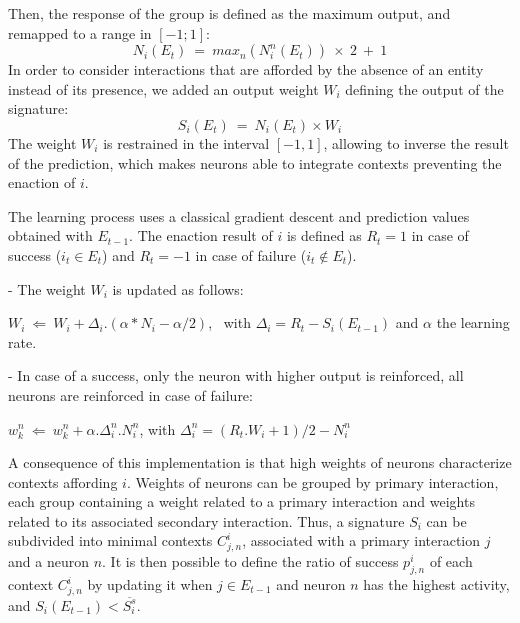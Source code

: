 \documentclass[conference]{IEEEtran}
\begin{document}
Then, the response of the group is defined as the maximum output, and remapped to a range in $[-1;1]$:
\begin{equation}
N_i(E_t)~=~max_n (N_i^n(E_t) ) \: \times \: 2 ~+~ 1
\end{equation}
In order to consider interactions that are afforded by the absence of an entity instead of its presence, we added an output weight $W_i$ defining the output of the signature:
\begin{equation}
S_i(E_t)~=~N_i(E_t) \times W_i
\end{equation}
The weight $W_i$ is restrained in the interval $[-1,1]$, allowing to inverse the result of the prediction, which makes neurons able to integrate contexts preventing the enaction of $i$.

The learning process uses a classical gradient descent and prediction values obtained with $E_{t-1}$.
The enaction result of $i$ is defined as $R_t=1$ in case of success ($i_t \in E_t$) and $R_t=-1$ in case of failure ($i_t \not\in E_t$).

- The weight $W_i$ is updated as follows:

$W_i ~\Leftarrow~ W_i+ \Delta_i . (\alpha * N_i - \alpha /2)$, ~with $\Delta_i=R_t-S_i(E_{t-1})$
and $\alpha$ the learning rate.

- In case of a success, only the neuron with higher output is reinforced, all neurons are reinforced in case of failure:

$w_k^n ~\Leftarrow~ w_k^n+ \alpha . \Delta_i^n . N_i^n$,
with $\Delta_i^n=(R_t.W_i + 1)/2 - N_i^n$


A consequence of this implementation is that high weights of neurons characterize contexts affording $i$.
Weights of neurons can be grouped by primary interaction, each group containing a weight related to a primary interaction and weights related to its associated secondary interaction. 
Thus, a signature $S_i$ can be subdivided into minimal contexts $C_{j,n}^i$, associated with a primary interaction $j$ and a neuron $n$. 
It is then possible to define the ratio of success $p_{j,n}^i$ of each context $C_{j,n}^i$ by updating it when $j \in E_{t-1}$ and neuron $n$ has the highest activity, and $S_i(E_{t-1})<\overline{S_i^s}$.
\end{document}
